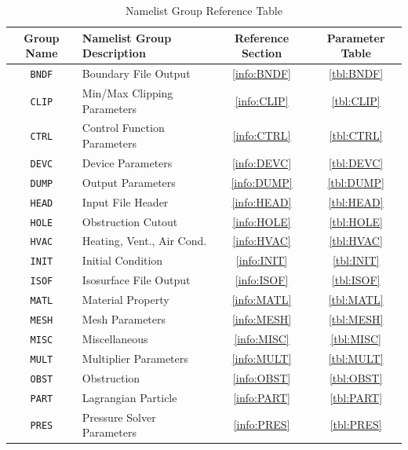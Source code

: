 \documentclass[11pt]{book}
\newcommand{\ct}{\tt\small}
\begin{document}
\vspace{\baselineskip}
\begin{table}[ht]
\begin{center}
\caption{Namelist Group Reference Table}
\label{tbl:namelistgroups}
\begin{tabular}{|c|l|c|c|}
\hline
Group Name  & Namelist Group Description& Reference Section & Parameter Table  \\ \hline
{\ct BNDF}  & Boundary File Output         & \ref{info:BNDF} & \ref{tbl:BNDF}  \\ \hline
{\ct CLIP}  & Min/Max Clipping Parameters  & \ref{info:CLIP} & \ref{tbl:CLIP}  \\ \hline
{\ct CTRL}  & Control Function Parameters  & \ref{info:CTRL} & \ref{tbl:CTRL}  \\ \hline
{\ct DEVC}  & Device Parameters            & \ref{info:DEVC} & \ref{tbl:DEVC}  \\ \hline
{\ct DUMP}  & Output Parameters            & \ref{info:DUMP} & \ref{tbl:DUMP}  \\ \hline
{\ct HEAD}  & Input File Header            & \ref{info:HEAD} & \ref{tbl:HEAD}  \\ \hline
{\ct HOLE}  & Obstruction Cutout           & \ref{info:HOLE} & \ref{tbl:HOLE}  \\ \hline
{\ct HVAC}  & Heating, Vent., Air Cond.    & \ref{info:HVAC} & \ref{tbl:HVAC}  \\ \hline
{\ct INIT}  & Initial Condition            & \ref{info:INIT} & \ref{tbl:INIT}  \\ \hline
{\ct ISOF}  & Isosurface File Output       & \ref{info:ISOF} & \ref{tbl:ISOF}  \\ \hline
{\ct MATL}  & Material Property            & \ref{info:MATL} & \ref{tbl:MATL}  \\ \hline
{\ct MESH}  & Mesh Parameters              & \ref{info:MESH} & \ref{tbl:MESH}  \\ \hline
{\ct MISC}  & Miscellaneous                & \ref{info:MISC} & \ref{tbl:MISC}  \\ \hline
{\ct MULT}  & Multiplier Parameters        & \ref{info:MULT} & \ref{tbl:MULT}  \\ \hline
{\ct OBST}  & Obstruction                  & \ref{info:OBST} & \ref{tbl:OBST}  \\ \hline
{\ct PART}  & Lagrangian Particle          & \ref{info:PART} & \ref{tbl:PART}  \\ \hline
{\ct PRES}  & Pressure Solver Parameters   & \ref{info:PRES} & \ref{tbl:PRES}  \\ \hline

\end{tabular}
\end{center}
\end{table}
\end{document}
